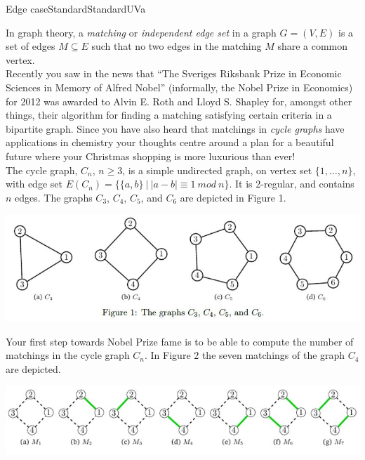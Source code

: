 \begin{problema}{Edge case}{Standard}{Standard}{UVa}

In graph theory, a \emph{matching} or \emph{independent edge set} in a graph $G = (V,E)$ is a set of edges $M \subseteq E$ such that no two edges in the matching $M$ share a common vertex. \\

Recently you saw in the news that ``The Sveriges Riksbank Prize in Economic Sciences in Memory of Alfred Nobel'' (informally, the Nobel Prize in Economics) for 2012 was awarded to Alvin E. Roth and Lloyd S. Shapley for, amongst other things, their algorithm for finding a matching satisfying certain criteria in a bipartite graph. Since you have also heard that matchings in \emph{cycle graphs} have applications in chemistry your thoughts centre around a plan for a beautiful future where your Christmas shopping is more luxurious than ever! \\

The cycle graph, $C_n$, $n \geq 3$, is a simple undirected graph, on vertex set $\{1,\dots,n \}$, with edge set $E(C_n) = \{\{a,b\}\ | \ |a-b| \equiv 1 \ mod \ n \}$. It is 2-regular, and contains $n$ edges. The graphs $C_3$, $C_4$, $C_5$, and $C_6$ are depicted in Figure 1.

\begin{center}
	\includegraphics[width=\textwidth]{Graficos/graph1}
\end{center} 

Your first step towards Nobel Prize fame is to be able to compute the number of matchings in the cycle graph $C_n$. In Figure 2 the seven matchings of the graph $C_4$ are depicted.

\begin{center}
	\includegraphics[width=\textwidth]{Graficos/graph2}
\end{center} 


\end{problema}
